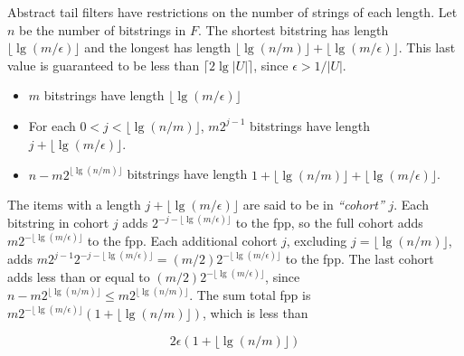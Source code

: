 \documentclass[11pt,letterpaper]{article}
\begin{document}

Abstract tail filters have restrictions on the number of strings of each length.
Let $n$ be the number of bitstrings in $F$.
The shortest bitstring has length $\lfloor \lg (m / \epsilon) \rfloor$ and the longest has length $\lfloor \lg (n/m) \rfloor + \lfloor \lg (m / \epsilon) \rfloor$.
This last value is guaranteed to be less than $\lceil 2 \lg |U| \rceil$, since $\epsilon > 1/|U|$.

\begin {itemize}
\item $m$ bitstrings have length $\lfloor \lg (m / \epsilon) \rfloor$
\item For each $0 < j < \lfloor \lg (n/m) \rfloor $, $m2^{j-1}$ bitstrings have length $j + \lfloor \lg (m / \epsilon) \rfloor$.
\item $n - m2^{\lfloor \lg (n/m) \rfloor}$ bitstrings have length $1 + \lfloor \lg (n/m) \rfloor  + \lfloor \lg (m / \epsilon) \rfloor$.
\end {itemize}

The items with a length $j + \lfloor \lg (m / \epsilon) \rfloor$ are said to be in {\em ``cohort''} $j$.
Each bitstring in cohort $j$ adds $2^{- j - \lfloor \lg (m / \epsilon) \rfloor}$ to the fpp, so the full cohort adds $m2^{- \lfloor \lg (m / \epsilon) \rfloor}$ to the fpp.
Each additional cohort $j$, excluding $j = \lfloor \lg (n/m) \rfloor$, adds $m 2^{j-1} 2^{-j - \lfloor \lg (m / \epsilon) \rfloor} = (m/2) 2^{-\lfloor \lg (m / \epsilon) \rfloor}$ to the fpp.
The last cohort adds less than or equal to $(m/2) 2^{-\lfloor \lg (m / \epsilon) \rfloor}$, since $n - m 2^{\lfloor \lg (n/m) \rfloor} \leq m 2^{\lfloor \lg(n/m)\rfloor}$.
The sum total fpp is $m 2^{- \lfloor \lg (m / \epsilon) \rfloor} (1 + \lfloor \lg (n/m) \rfloor)$, which is less than

\begin{equation}
  2 \epsilon (1 + \lfloor \lg (n/m) \rfloor)
\end{equation}

\end{document}
